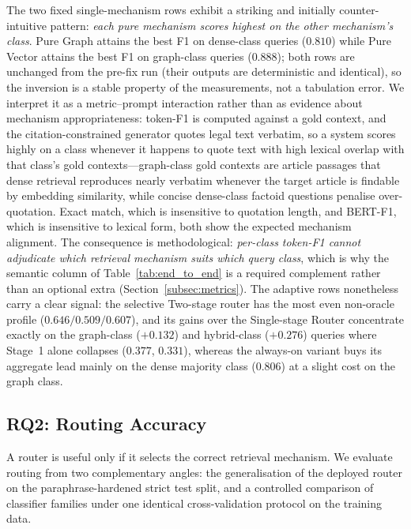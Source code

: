 \documentclass[pdflatex,sn-mathphys-num]{sn-jnl}
\begin{document}
The two fixed single-mechanism rows exhibit a striking and initially
counter-intuitive pattern: \emph{each pure mechanism scores highest on the
other mechanism's class}. Pure Graph attains the best F1 on dense-class
queries ($0.810$) while Pure Vector attains the best F1 on graph-class
queries ($0.888$); both rows are unchanged from the pre-fix run (their
outputs are deterministic and identical), so the inversion is a stable
property of the measurements, not a tabulation error. We interpret it as a
metric--prompt interaction rather than as evidence about mechanism
appropriateness: token-F1 is computed against a gold context, and the
citation-constrained generator quotes legal text verbatim, so a system
scores highly on a class whenever it happens to quote text with high lexical
overlap with that class's gold contexts---graph-class gold contexts are
article passages that dense retrieval reproduces nearly verbatim whenever
the target article is findable by embedding similarity, while concise
dense-class factoid questions penalise over-quotation. Exact match, which is
insensitive to quotation length, and BERT-F1, which is insensitive to
lexical form, both show the expected mechanism alignment. The consequence is
methodological: \emph{per-class token-F1 cannot adjudicate which retrieval
mechanism suits which query class}, which is why the semantic column of
Table~\ref{tab:end_to_end} is a required complement rather than an optional
extra (Section~\ref{subsec:metrics}). The adaptive rows nonetheless carry a
clear signal: the selective Two-stage router has the most even non-oracle
profile ($0.646/0.509/0.607$), and its gains over the Single-stage Router
concentrate exactly on the graph-class ($+0.132$) and hybrid-class
($+0.276$) queries where Stage~1 alone collapses ($0.377$, $0.331$), whereas
the always-on variant buys its aggregate lead mainly on the dense majority
class ($0.806$) at a slight cost on the graph class.

\subsection{RQ2: Routing Accuracy}\label{subsec:rq2}

A router is useful only if it selects the correct retrieval mechanism. We
evaluate routing from two complementary angles: the generalisation of the
deployed router on the paraphrase-hardened strict test split, and a
controlled comparison of classifier families under one identical
cross-validation protocol on the training data.
\end{document}
